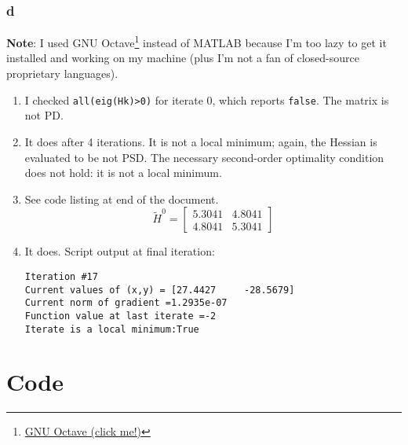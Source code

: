 \documentclass[11pt]{report}
\theoremstyle{definition}
\begin{document}
\subsubsection*{d}
\textbf{Note}: I used GNU Octave\footnote{\href{https://octave.org/}{GNU Octave (click me!)}}
instead of MATLAB because I'm too lazy to get it installed and working on my machine (plus
I'm not a fan of closed-source proprietary languages).
\begin{enumerate}
	\item I checked \lstinline{all(eig(Hk)>0)} for iterate 0, which reports
	      \lstinline{false}. The matrix is not PD.
	\item It does after 4 iterations. It is not a local minimum; again, the
	      Hessian is evaluated to be not PSD. The necessary second-order optimality
	      condition does not hold: it is not a local minimum.
	\item See code listing at end of the document.
	      \[
		      \tilde{H}^0 = \begin{bmatrix}
			      5.3041 & 4.8041 \\
			      4.8041 & 5.3041
		      \end{bmatrix}
	      \]
	\item It does. Script output at final iteration:
	      \begin{lstlisting}
Iteration #17
Current values of (x,y) = [27.4427     -28.5679]
Current norm of gradient =1.2935e-07
Function value at last iterate =-2
Iterate is a local minimum:True
\end{lstlisting}
\end{enumerate}

\newpage
\section*{Code}
\lstset{style=mystyle}



\end{document}
